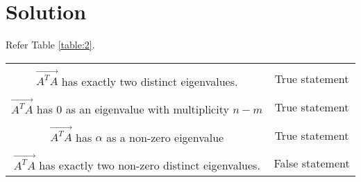\documentclass[journal,12pt,twocolumn]{IEEEtran}
\begin{document}
\section{Solution}
Refer Table \ref{table:2}.

\renewcommand{\thetable}{1}
\begin{table*}[ht]
\begin{center}
\begin{tabular}{|c|c|}
\hline
& \\
$\vec{A^TA}$ has exactly two distinct eigenvalues.
& True statement\\
\hline
& \\
$\vec{A^TA}$ has 0 as an eigenvalue with multiplicity $n-m$
& True statement\\
\hline
& \\
$\vec{A^TA}$ has $\alpha$ as a non-zero eigenvalue
&  True statement\\
\hline
& \\
$\vec{A^TA}$ has exactly two non-zero distinct eigenvalues.
& False statement\\
\hline
\end{tabular}
\caption{Solution}
\label{table:2}
\end{center}
\end{table*}
\end{document}
